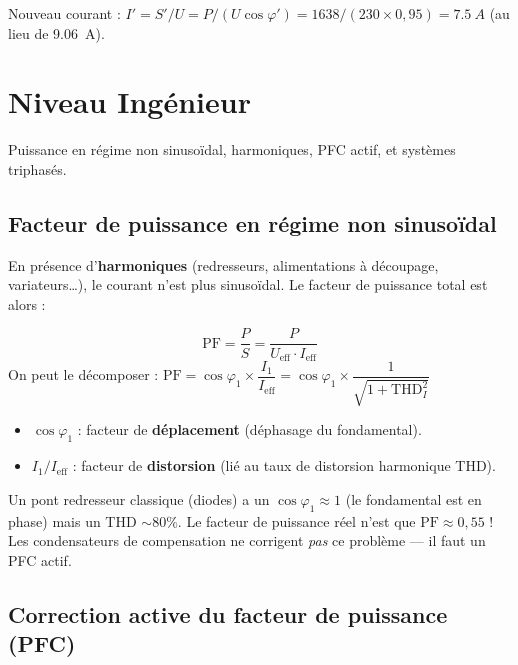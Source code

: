 \documentclass[12pt,a4paper,twoside]{book}
\begin{document}
Nouveau courant : $I' = S'/U = P/(U\cos\varphi') = 1638/(230\times0{,}95) = \SI{7.5}{A}$ (au lieu de \SI{9.06}{A}).

\section{Niveau Ingénieur}

\begin{ingenieur}
Puissance en régime non sinusoïdal, harmoniques, PFC actif, et systèmes triphasés.
\end{ingenieur}

\subsection{Facteur de puissance en régime non sinusoïdal}

En présence d'\textbf{harmoniques} (redresseurs, alimentations à découpage, variateurs\ldots), le courant n'est plus sinusoïdal. Le facteur de puissance total est alors :

\begin{formule}
\[
\boxed{\text{PF} = \frac{P}{S} = \frac{P}{U_{\text{eff}} \cdot I_{\text{eff}}}}
\]
On peut le décomposer : $\text{PF} = \cos\varphi_1 \times \dfrac{I_1}{I_{\text{eff}}} = \cos\varphi_1 \times \dfrac{1}{\sqrt{1 + \text{THD}_I^2}}$

\begin{itemize}[nosep]
\item $\cos\varphi_1$ : facteur de \textbf{déplacement} (déphasage du fondamental).
\item $I_1/I_{\text{eff}}$ : facteur de \textbf{distorsion} (lié au taux de distorsion harmonique THD).
\end{itemize}
\end{formule}

\begin{attention}
Un pont redresseur classique (diodes) a un $\cos\varphi_1 \approx 1$ (le fondamental est en phase) mais un THD $\sim 80\%$. Le facteur de puissance réel n'est que $\text{PF} \approx 0{,}55$ ! Les condensateurs de compensation ne corrigent \textit{pas} ce problème --- il faut un PFC actif.
\end{attention}

\subsection{Correction active du facteur de puissance (PFC)}
\end{document}
